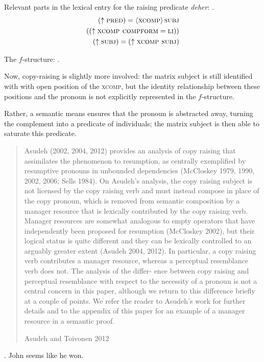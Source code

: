 \documentclass[11pt]{article}
\begin{document}
Relevant parts in the lexical entry for the raising predicate \emph{deher}:
\ex.  \begin{align*}
  (\uparrow \textsc{pred}) = \left\langle \textsc{xcomp} \right\rangle \textsc{subj} \\
  ((\uparrow \textsc{xcomp compform} = \textsc{li})) \\
  (\uparrow \textsc{subj}) = (\uparrow \textsc{xcomp subj}) \\
\end{align*}

The \(f\)-structure:
\ex. 

Now, copy-raising is slightly more involved: the matrix subject is still identified with with open position of the \textsc{xcomp}, but the identity relationship between these positions and the pronoun is not explicitly represented in the \(f\)-structure.

Rather, a semantic means ensures that the pronoun is abstracted away, turning the complement into a predicate of individuals; the matrix subject is then able to saturate this predicate.
\blockquote[Asudeh and Toivonen 2012]{
Asudeh (2002, 2004, 2012) provides an analysis of copy raising that assimilates the phenomenon to resumption, as centrally exemplified by resumptive pronouns in unbounded dependencies (McCloskey 1979, 1990, 2002, 2006; Sells 1984). 
On Asudeh’s analysis, the copy raising subject is not licensed by the copy raising verb and must instead compose in place of the copy pronoun, which is removed from semantic composition by a manager resource that is lexically contributed by the copy raising verb. 
Manager resources are somewhat analogous to empty operators that have independently been proposed for resumption (McCloskey 2002), but their logical status is quite different and they can be lexically controlled to an arguably greater extent (Asudeh 2004, 2012). 
In particular, a copy raising verb contributes a manager resource, whereas a perceptual resemblance verb does not. 
The analysis of the differ- ence between copy raising and perceptual resemblance with respect to the necessity of a pronoun is not a central concern in this paper, although we return to this difference briefly at a couple of points. 
We refer the reader to Asudeh’s work for further details and to the appendix of this paper for an example of a manager resource in a semantic proof.
}
\ex. John seems like he won.
\end{document}
